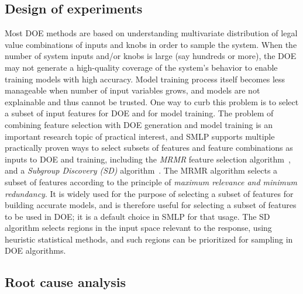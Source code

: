 \documentclass[a4paper,parskip=half]{article} %
\begin{document}
\subsection{Design of experiments}\label{sssect:doe}

Most DOE methods
are %
based on understanding multivariate distribution of legal value combinations
of inputs and knobs %
in order to sample the system.
\pagebreak[3]
When the number of system inputs and/or knobs is large (say hundreds or more), the DOE may not  generate a high-quality coverage of the system’s behavior to enable training models with high accuracy.
Model training process itself becomes less manageable when number of input variables grows,
and models are not explainable and thus cannot be trusted.
One way to curb this problem is to select a subset of input features for DOE and for model training.
The problem of combining feature selection with DOE generation and model training
is an important research topic of practical interest,
and SMLP supports multiple practically proven ways
to select subsets of features and feature combinations as inputs to DOE and training,
including the \emph{MRMR} feature selection algorithm~\cite{DBLP:journals/jbcb/DingP05},
and a \emph{Subgroup Discovery (SD)} algorithm~\cite{DBLP:books/mit/fayyadPSU96/Klosgen96,DBLP:conf/pkdd/Wrobel97,DBLP:journals/widm/Atzmueller15}.
The MRMR algorithm selects a subset of features according to the principle of \emph{maximum relevance and minimum redundancy}.
It is widely used for the purpose of selecting a subset of features for building accurate models,
and is therefore useful for selecting a subset of features to be used in DOE;
it is a default choice in SMLP for that usage.
The SD algorithm selects regions in the input space relevant to the response,
using heuristic statistical methods,
and such regions can be prioritized for sampling in DOE algorithms.



\subsection{Root cause analysis}
\end{document}
